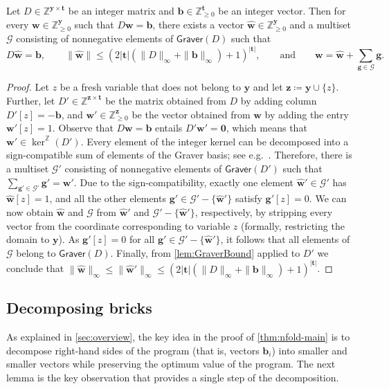 \documentclass{theoretics}
\renewcommand{\leq}{\leqslant}
\renewcommand{\geq}{\geqslant}
\newcommand{\Z}{\mathbb{Z}}
\newcommand{\Zn}{\Z_{\geq 0}}
\newcommand{\tup}[1]{{\mathbf{#1}}}
\newcommand{\ww}{\tup w}
\newcommand{\whww}{{\widehat{\ww}}}
\newcommand{\yy}{\tup y}
\newcommand{\zz}{\tup z}
\newcommand{\tv}{\tup t}
\newcommand{\bb}{\tup b}
\renewcommand{\gg}{\tup g}
\newcommand{\matrices}[3]{#1^{#2\times #3}}
\newcommand{\Graver}{\mathsf{Graver}}
\newcommand{\Gg}{\mathcal{G}}
\renewcommand{\setminus}{-}
\begin{document}
\begin{lemma}\label{lem:GraverDecomp}
Let $D \in \matrices{\Z}{\yy}{\tv}$ be an integer matrix and $\bb \in \Zn^{\tv}$ be an integer vector. Then for every $\ww\in \Zn^{\yy}$ such that $D\ww=\bb$, there exists a vector $\whww\in \Zn^{\yy}$ and a multiset $\Gg$ consisting of nonnegative elements of $\Graver(D)$ such that $$D\whww=\bb, \qquad\|\whww\|\leq (2|\tv|(\|D\|_\infty+\|\bb\|_\infty)+1)^{|\tv|},\qquad \textrm{and}\qquad \ww=\whww+\sum_{\gg\in \Gg} \gg.$$
\end{lemma}
\begin{proof}
Let $z$ be a fresh variable that does not belong to $\yy$ and let $\zz\coloneqq \yy\cup \{z\}$. Further, let $D'\in \matrices{\Z}{\zz}{\tv}$ be the matrix obtained from $D$ by adding column $D'[z]=-\bb$, and $\ww'\in \Zn^{\zz}$ be the vector obtained from $\ww$ by adding the entry $\ww'[z]=1$. Observe that $D\ww=\bb$ entails $D'\ww'=\mathbf{0}$, which means that $\ww'\in \ker^\Z(D')$. Every element of the integer kernel can be decomposed into a sign-compatible sum of elements of the Graver basis; see e.g.~\cite[Lemma~3.2.3]{JesusBook}. Therefore, there is a multiset $\Gg'$ consisting of nonnegative elements of $\Graver(D')$ such that $\sum_{\gg'\in \Gg'}\gg'=\ww'$.
Due to the sign-compatibility, exactly one element $\whww' \in \Gg'$ has $\whww[z]=1$, and all the other elements $\gg'\in \Gg'\setminus \{\whww'\}$ satisfy $\gg'[z]=0$. We can now obtain $\whww$ and $\Gg$ from $\whww'$ and $\Gg'\setminus \{\whww'\}$, respectively, by stripping every vector from the coordinate corresponding to variable $z$ (formally, restricting the domain to $\yy$). As $\gg'[z]=0$ for all $\gg'\in \Gg'\setminus \{\whww'\}$, it follows that all elements of $\Gg$ belong to $\Graver(D)$. Finally, from \cref{lem:GraverBound} applied to $D'$ we conclude that $\|\whww\|_\infty\leq \|\whww'\|_\infty\leq (2|\tv|(\|D\|_\infty+\|\bb\|_\infty)+1)^{|\tv|}$.
\end{proof}

\subsection{Decomposing bricks}

As explained in \cref{sec:overview}, the key idea in the proof of \cref{thm:nfold-main} is to decompose right-hand sides of the program (that is, vectors $\bb_i$) into smaller and smaller vectors while preserving the optimum value of the program. The next lemma is the key observation that provides a single step of the decomposition.
\end{document}
